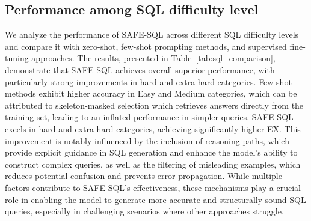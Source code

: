 

\subsection{Performance among SQL difficulty level}
We analyze the performance of SAFE-SQL across different SQL difficulty levels and compare it with zero-shot, few-shot prompting methods, and supervised fine-tuning approaches. The results, presented in Table~\ref{tab:sql_comparison}, demonstrate that SAFE-SQL achieves overall superior performance, with particularly strong improvements in hard and extra hard categories. Few-shot methods exhibit higher accuracy in Easy and Medium categories, which can be attributed to skeleton-masked selection which retrieves answers directly from the training set, leading to an inflated performance in simpler queries. SAFE-SQL excels in hard and extra hard categories, achieving significantly higher EX. This improvement is notably influenced by the inclusion of reasoning paths, which provide explicit guidance in SQL generation and enhance the model’s ability to construct complex queries, as well as the filtering of misleading examples, which reduces potential confusion and prevents error propagation. While multiple factors contribute to SAFE-SQL's effectiveness, these mechanisms play a crucial role in enabling the model to generate more accurate and structurally sound SQL queries, especially in challenging scenarios where other approaches struggle.


